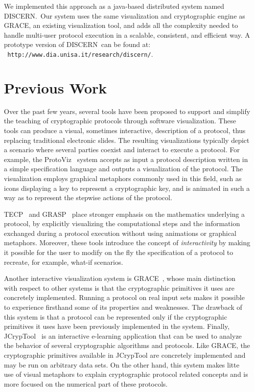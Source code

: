 \documentclass[conference]{IEEEtran}
\def\disgrace{DISCERN}
\begin{document}



We implemented this approach as a java-based distributed system named
\disgrace.\ Our system uses the same visualization and cryptographic
engine as GRACE, an existing visualization tool, and adds all the
complexity needed to handle multi-user protocol execution in a
scalable, consistent, and efficient way. A prototype version of \disgrace\ can be found at:\\ {\tt
 http://www.dia.unisa.it/research/discern/}.


\section{Previous Work}
Over the past few years, several tools have been proposed to support
and simplify the teaching of cryptographic protocols through software
visualization. These tools can produce a visual, sometimes
interactive, description of a protocol, thus replacing traditional
electronic slides. The resulting visualizations typically depict a
scenario where several parties coexist and interact to execute a
protocol. For example, the ProtoViz~\cite{Protoviz} system accepts as
input a protocol description written in a simple specification
language and outputs a visualization of the protocol. The
visualization employs graphical metaphors commonly used in this field,
such as icons displaying a key to represent a cryptographic key, and
is animated in such a way as to represent the stepwise actions of the
protocol.


TECP~\cite{TECP} and GRASP~\cite{Schweitzer06} place stronger emphasis
on the mathematics underlying a protocol, by explicitly visualizing
the computational steps and the information exchanged during a
protocol execution without using animations or graphical
metaphors. Moreover, these tools introduce the concept of {\em
  interactivity} by making it possible for the user to modify on the
fly the specification of a protocol to recreate, for example, what-if
scenarios.

Another interactive visualization system is GRACE~\cite{Cattaneo08},
whose main distinction with respect to other systems is that the
cryptographic primitives it uses are concretely implemented. Running a protocol on real input sets makes it
possible to experience firsthand some of its properties and
weaknesses. The drawback of this system is that a protocol can be
represented only if the cryptographic primitives it uses have been
previously implemented in the system. Finally,
JCrypTool~\cite{jcryptool} is an interactive e-learning application that can be used
to analyze the behavior of several cryptographic algorithms and
protocols. Like GRACE, the cryptographic primitives available in
JCrypTool are concretely implemented and may be run on arbitrary data
sets. On the other hand, this system makes litte use of visual metaphors
to explain cryptographic protocol related concepts and is more focused
on the numerical part of these protocols.
\end{document}
